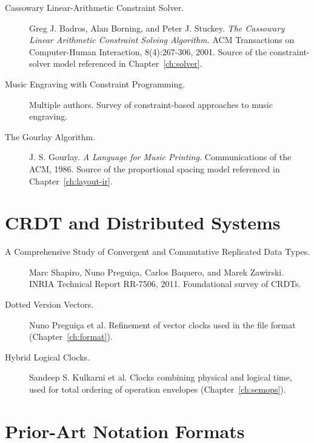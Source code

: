 \documentclass[11pt,letterpaper]{report}
\begin{document}
\begin{description}
  \item[Cassowary Linear-Arithmetic Constraint Solver.]
    Greg J. Badros, Alan Borning, and Peter J. Stuckey.
    \emph{The Cassowary Linear Arithmetic Constraint Solving
    Algorithm.} ACM Transactions on Computer-Human Interaction,
    8(4):267-306, 2001. Source of the constraint-solver model
    referenced in Chapter~\ref{ch:solver}.
  \item[Music Engraving with Constraint Programming.]
    Multiple authors. Survey of constraint-based approaches to
    music engraving.
  \item[The Gourlay Algorithm.] J. S. Gourlay. \emph{A Language
    for Music Printing.} Communications of the ACM, 1986. Source
    of the proportional spacing model referenced in
    Chapter~\ref{ch:layout-ir}.
\end{description}

\section*{CRDT and Distributed Systems}

\begin{description}
  \item[A Comprehensive Study of Convergent and Commutative
    Replicated Data Types.] Marc Shapiro, Nuno Pregui\c{c}a,
    Carlos Baquero, and Marek Zawirski. INRIA Technical Report
    RR-7506, 2011. Foundational survey of CRDTs.
  \item[Dotted Version Vectors.] Nuno Pregui\c{c}a et al.
    Refinement of vector clocks used in the file format
    (Chapter~\ref{ch:format}).
  \item[Hybrid Logical Clocks.] Sandeep S. Kulkarni et al.
    Clocks combining physical and logical time, used for total
    ordering of operation envelopes
    (Chapter~\ref{ch:semops}).
\end{description}

\section*{Prior-Art Notation Formats}
\end{document}
